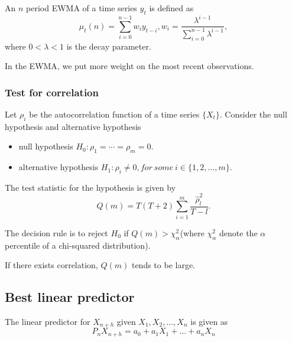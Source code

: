 \begin{definition} An $n$ period EWMA of a time series $y_t$ is defined as
	$$\hat{\mu}_t(n) =\sum_{i=0}^{n-1} w_i y_{t-i}, w_i = \frac{\lambda^{i-1}}{\sum_{i=0}^{n-1}\lambda^{i-1}},$$
	where $0<\lambda < 1$ is the decay parameter.	
\end{definition}

\begin{remark}
	In the EWMA, we put more weight on the most recent observations.
\end{remark}

\subsubsection{Test for correlation}
\begin{definition}\cite[32]{tsay2005analysis}\label{ch:time-series-analysis:def:LjungBoxSerialCorrelationTest}
Let $\rho_i$ be the autocorrelation function of a time series $\{X_t\}$. Consider the null hypothesis and alternative hypothesis
\begin{itemize}
	\item null hypothesis $H_0: \rho_1 = \cdots = \rho_m = 0.$
	\item alternative hypothesis $H_1: \rho_i\neq 0, for~some~ i\in \{1,2,...,m\}$.
\end{itemize}
 The test statistic for the hypothesis is given by	
	$$Q(m) = T(T+2)\sum_{i=1}^m \frac{\hat{\rho}_l^2}{T-l}.$$

The decision rule is to reject $H_0$ if $Q(m) > \chi^2_\alpha$(where $\chi^2_\alpha$ denote the $\alpha$ percentile of a chi-squared distribution). 	
\end{definition}

\begin{remark}[interpretation]
If there exists correlation, $Q(m)$ tends to be large.	
\end{remark}


\subsection{Best linear predictor}
\begin{definition}
	The linear predictor for $X_{n+h}$ given $X_1,X_2,...,X_n$ is given as
	$$P_nX_{n+h} = a_0 + a_1X_1 + ... + a_nX_n$$
\end{definition}

